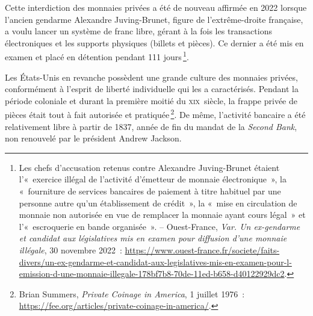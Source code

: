 \documentclass[a4paper,notitlepage]{article}
\newcommand{\eng}[1]{{\NoAutoSpaceBeforeFDP\emph{#1}}}  %
\newcommand{\sfootnote}{\,\footnote}
\begin{document}
Cette interdiction des monnaies privées a été de nouveau affirmée en 2022 lorsque l'ancien gendarme Alexandre Juving-Brunet, figure de l'extrême-droite française, a voulu lancer un système de franc libre, gérant à la fois les transactions électroniques et les supports physiques (billets et pièces). Ce dernier a été mis en examen et placé en détention pendant 111 jours\sfootnote{Les chefs d'accusation retenus contre Alexandre Juving-Brunet étaient l'«~exercice illégal de l'activité d'émetteur de monnaie électronique~», la «~fourniture de services bancaires de paiement à titre habituel par une personne autre qu'un établissement de crédit~», la «~mise en circulation de monnaie non autorisée en vue de remplacer la monnaie ayant cours légal~» et l'«~escroquerie en bande organisée~». -- Ouest-France, \emph{Var. Un ex-gendarme et candidat aux législatives mis en examen pour diffusion d'une monnaie illégale}, 30 novembre 2022~: \url{https://www.ouest-france.fr/societe/faits-divers/un-ex-gendarme-et-candidat-aux-legislatives-mis-en-examen-pour-l-emission-d-une-monnaie-illegale-178bf7b8-70de-11ed-b658-d40122929dc2}.}.

Les États-Unis en revanche possèdent une grande culture des monnaies privées, conformément à l'esprit de liberté individuelle qui les a caractérisés. Pendant la période coloniale et durant la première moitié du \textsc{xix}\ieme{}~siècle, la frappe privée de pièces était tout à fait autorisée et pratiquée\sfootnote{Brian Summers, \eng{Private Coinage in America}, 1\ier{} juillet 1976~: \url{https://fee.org/articles/private-coinage-in-america/}.}. De même, l'activité bancaire a été relativement libre à partir de 1837, année de fin du mandat de la \eng{Second Bank}, non renouvelé par le président Andrew Jackson.
\end{document}
